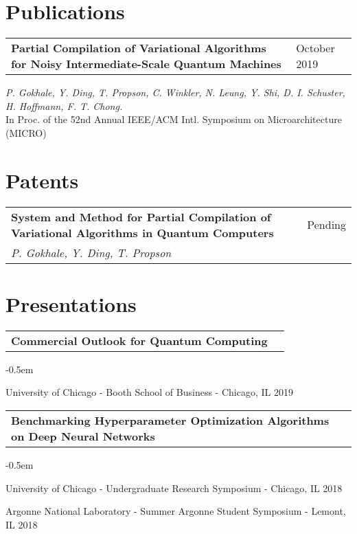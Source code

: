 \documentclass[letterpaper, 12pt]{article}
\let\olditemize=\itemize
\let\endolditemize=\enditemize
\renewenvironment{itemize}{\olditemize \itemsep-0.5em}
                 {\endolditemize}
\begin{document}
\section{Publications}
\begin{tabular}{@{} L{12cm} @{} R{4.51cm} @{}}
  \textbf{Partial Compilation of Variational Algorithms for Noisy Intermediate-Scale Quantum Machines} & October 2019 \\
\end{tabular}
\textit{P. Gokhale, Y. Ding, T. Propson, C. Winkler, N. Leung, Y. Shi, D. I. Schuster, H. Hoffmann, F. T. Chong.}\\
In Proc. of the 52nd Annual IEEE/ACM Intl. Symposium on Microarchitecture (MICRO)\\
\vspace{2pt}


\section{Patents}
\begin{tabular}{@{} L{12cm} @{} R{4.51cm} @{}}
  \textbf{System and Method for Partial Compilation of Variational Algorithms in Quantum Computers}
  & Pending \\
  \textit{P. Gokhale, Y. Ding, T. Propson}\\
\end{tabular}


\pagebreak


\section{Presentations}
\begin{tabular}{@{} L{12cm} @{} R{4.51cm} @{}}
  \textbf{Commercial Outlook for Quantum Computing} & \\
\end{tabular}
\vspace{-2.0em}
\begin{itemize}
  \item University of Chicago - Booth School of Business - Chicago, IL 2019
\end{itemize}
\vspace{-0.5em}

\begin{tabular}{@{} L{12cm} @{} R{4.51cm} @{}}
  \textbf{Benchmarking Hyperparameter Optimization Algorithms on Deep Neural Networks} & \\
\end{tabular}
\vspace{-1.5em}
\begin{itemize}
  \item University of Chicago - Undergraduate Research Symposium - Chicago, IL 2018\\
  \item Argonne National Laboratory - Summer Argonne Student Symposium - Lemont, IL 2018\\
\end{itemize}
\end{document}
